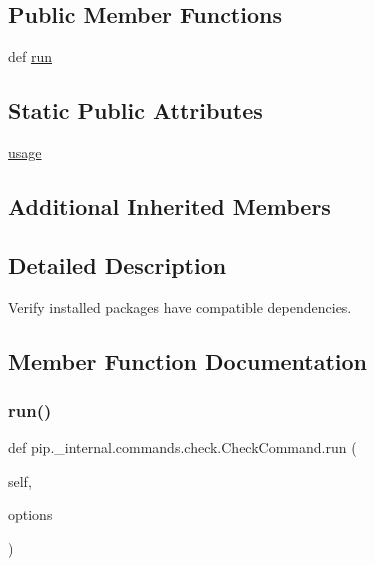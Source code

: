 \subsection*{Public Member Functions}
\begin{DoxyCompactItemize}
\item 
def \hyperlink{classpip_1_1__internal_1_1commands_1_1check_1_1CheckCommand_a23c271be982ab1c47cfb134322929ffa}{run}
\end{DoxyCompactItemize}
\subsection*{Static Public Attributes}
\begin{DoxyCompactItemize}
\item 
\hyperlink{classpip_1_1__internal_1_1commands_1_1check_1_1CheckCommand_a6f45ee91585e4679ad01411976d269ab}{usage}
\end{DoxyCompactItemize}
\subsection*{Additional Inherited Members}


\subsection{Detailed Description}
\begin{DoxyVerb}Verify installed packages have compatible dependencies.\end{DoxyVerb}
 

\subsection{Member Function Documentation}
\mbox{\label{classpip_1_1__internal_1_1commands_1_1check_1_1CheckCommand_a23c271be982ab1c47cfb134322929ffa}} 
\subsubsection{\texorpdfstring{run()}{run()}}
{\footnotesize\ttfamily def pip.\+\_\+internal.\+commands.\+check.\+Check\+Command.\+run (\begin{DoxyParamCaption}\item[{}]{self,  }\item[{}]{options }\end{DoxyParamCaption})}



